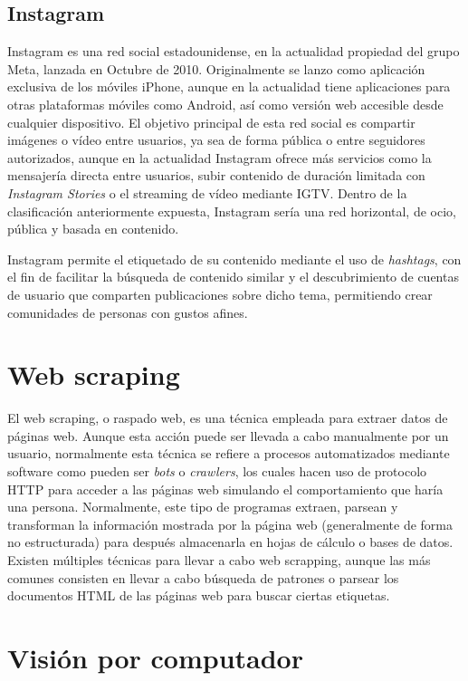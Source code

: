 \subsection{Instagram}

Instagram es una red social estadounidense, en la actualidad propiedad del grupo Meta, lanzada en Octubre de 2010. Originalmente se lanzo como aplicación exclusiva de los móviles iPhone, aunque en la actualidad tiene aplicaciones para otras plataformas móviles como Android, así como versión web accesible desde cualquier dispositivo. El objetivo principal de esta red social es compartir imágenes o vídeo entre usuarios, ya sea de forma pública o entre seguidores autorizados, aunque en la actualidad Instagram ofrece más servicios como la mensajería directa entre usuarios, subir contenido de duración limitada con \textit{Instagram Stories} o el streaming de vídeo mediante IGTV. Dentro de la clasificación anteriormente expuesta, Instagram sería una red horizontal, de ocio, pública y basada en contenido.

Instagram permite el etiquetado de su contenido mediante el uso de \textit{hashtags}, con el fin de facilitar la búsqueda de contenido similar y el descubrimiento de cuentas de usuario que comparten publicaciones sobre dicho tema, permitiendo crear comunidades de personas con gustos afines.

\section{Web scraping}

El web scraping, o raspado web, es una técnica empleada para extraer datos de páginas web. Aunque esta acción puede ser llevada a cabo manualmente por un usuario, normalmente esta técnica se refiere a procesos automatizados mediante software como pueden ser \textit{bots} o \textit{crawlers}, los cuales hacen uso de protocolo HTTP para acceder a las páginas web simulando el comportamiento que haría una persona. Normalmente, este tipo de programas extraen, parsean y transforman la información mostrada por la página web (generalmente de forma no estructurada) para después almacenarla en hojas de cálculo o bases de datos. Existen múltiples técnicas para llevar a cabo web scrapping, aunque las más comunes consisten en llevar a cabo búsqueda de patrones o parsear los documentos HTML de las páginas web para buscar ciertas etiquetas.

\section{Visión por computador}

